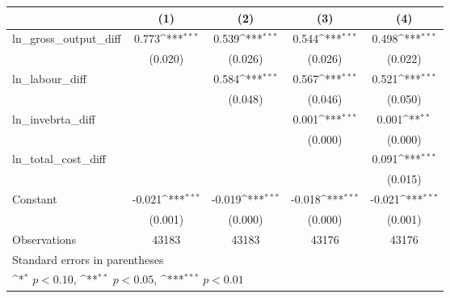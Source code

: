 {
\def\sym#1{\ifmmode^{#1}\else\(^{#1}\)\fi}
\begin{tabular}{l*{4}{c}}
\hline\hline
                &\multicolumn{1}{c}{(1)}         &\multicolumn{1}{c}{(2)}         &\multicolumn{1}{c}{(3)}         &\multicolumn{1}{c}{(4)}         \\
\hline
ln\_gross\_output\_diff&    0.773\sym{***}&    0.539\sym{***}&    0.544\sym{***}&    0.498\sym{***}\\
                &  (0.020)         &  (0.026)         &  (0.026)         &  (0.022)         \\
[1em]
ln\_labour\_diff  &                  &    0.584\sym{***}&    0.567\sym{***}&    0.521\sym{***}\\
                &                  &  (0.048)         &  (0.046)         &  (0.050)         \\
[1em]
ln\_invebrta\_diff&                  &                  &    0.001\sym{***}&    0.001\sym{**} \\
                &                  &                  &  (0.000)         &  (0.000)         \\
[1em]
ln\_total\_cost\_diff&                  &                  &                  &    0.091\sym{***}\\
                &                  &                  &                  &  (0.015)         \\
[1em]
Constant        &   -0.021\sym{***}&   -0.019\sym{***}&   -0.018\sym{***}&   -0.021\sym{***}\\
                &  (0.001)         &  (0.000)         &  (0.000)         &  (0.001)         \\
\hline
Observations    &    43183         &    43183         &    43176         &    43176         \\
\hline\hline
\multicolumn{5}{l}{\footnotesize Standard errors in parentheses}\\
\multicolumn{5}{l}{\footnotesize \sym{*} \(p<0.10\), \sym{**} \(p<0.05\), \sym{***} \(p<0.01\)}\\
\end{tabular}
}
